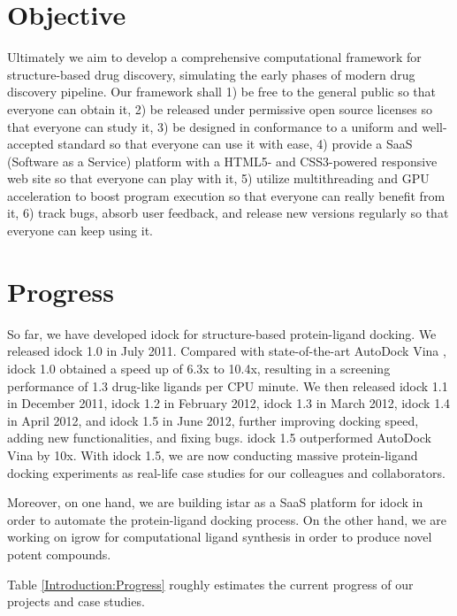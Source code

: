 \section{Objective}

Ultimately we aim to develop a comprehensive computational framework for structure-based drug discovery, simulating the early phases of modern drug discovery pipeline. Our framework shall 1) be free to the general public so that everyone can obtain it, 2) be released under permissive open source licenses so that everyone can study it, 3) be designed in conformance to a uniform and well-accepted standard so that everyone can use it with ease, 4) provide a SaaS (Software as a Service) platform with a HTML5- and CSS3-powered responsive web site so that everyone can play with it, 5) utilize multithreading and GPU acceleration to boost program execution so that everyone can really benefit from it, 6) track bugs, absorb user feedback, and release new versions regularly so that everyone can keep using it.

\section{Progress}

So far, we have developed idock for structure-based protein-ligand docking. We released idock 1.0 in July 2011. Compared with state-of-the-art AutoDock Vina \citep{595}, idock 1.0 obtained a speed up of 6.3x to 10.4x, resulting in a screening performance of 1.3 drug-like ligands per CPU minute. We then released idock 1.1 in December 2011, idock 1.2 in February 2012, idock 1.3 in March 2012, idock 1.4 in April 2012, and idock 1.5 in June 2012, further improving docking speed, adding new functionalities, and fixing bugs. idock 1.5 outperformed AutoDock Vina by 10x. With idock 1.5, we are now conducting massive protein-ligand docking experiments as real-life case studies for our colleagues and collaborators.

Moreover, on one hand, we are building istar as a SaaS platform for idock in order to automate the protein-ligand docking process. On the other hand, we are working on igrow for computational ligand synthesis in order to produce novel potent compounds.

Table \ref{Introduction:Progress} roughly estimates the current progress of our projects and case studies.


